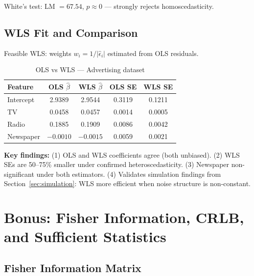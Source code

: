 \documentclass[11pt,a4paper]{article}
\begin{document}
White's test: LM $=67.54$, $p\approx 0$ --- strongly rejects homoscedasticity.

\subsection{WLS Fit and Comparison}

Feasible WLS: weights $w_i=1/|\hat{\epsilon}_i|$ estimated from OLS residuals.

\begin{table}[H]
\centering\small
\caption{OLS vs WLS --- Advertising dataset}
\begin{tabular}{lcccc}
\toprule
\textbf{Feature} & \textbf{OLS} $\hat{\beta}$ & \textbf{WLS} $\hat{\beta}$
               & \textbf{OLS SE} & \textbf{WLS SE} \\
\midrule
Intercept  & 2.9389 & 2.9544 & 0.3119 & 0.1211 \\
TV         & 0.0458 & 0.0457 & 0.0014 & 0.0005 \\
Radio      & 0.1885 & 0.1909 & 0.0086 & 0.0042 \\
Newspaper  & $-0.0010$ & $-0.0015$ & 0.0059 & 0.0021 \\
\bottomrule
\end{tabular}
\end{table}

\begin{resultbox}
\small \textbf{Key findings:} (1) OLS and WLS coefficients agree (both unbiased).
(2) WLS SEs are 50--75\% smaller under confirmed heteroscedasticity.
(3) Newspaper non-significant under both estimators.
(4) Validates simulation findings from Section~\ref{sec:simulation}: WLS more efficient
when noise structure is non-constant.
\end{resultbox}

\section*{Bonus: Fisher Information, CRLB, and Sufficient Statistics}

\subsection*{Fisher Information Matrix}
\end{document}
